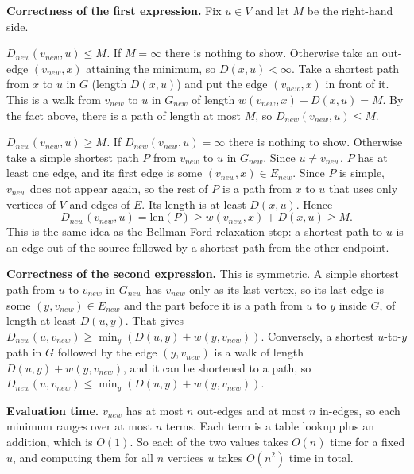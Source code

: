 \documentclass[11pt,addpoints,answers]{exam}
\begin{document}
\begin{questions}
\begin{parts}
\begin{solution}
      \textbf{Correctness of the first expression.}
      Fix $u \in V$ and let $M$ be the right-hand side.

      \emph{$D_{new}(v_{new},u) \le M$.}
      If $M = \infty$ there is nothing to show.
      Otherwise take an out-edge $(v_{new},x)$ attaining the minimum, so $D(x,u) < \infty$.
      Take a shortest path from $x$ to $u$ in $G$ (length $D(x,u)$) and put the edge $(v_{new},x)$ in front of it.
      This is a walk from $v_{new}$ to $u$ in $G_{new}$ of length $w(v_{new},x) + D(x,u) = M$.
      By the fact above, there is a path of length at most $M$, so $D_{new}(v_{new},u) \le M$.

      \emph{$D_{new}(v_{new},u) \ge M$.}
      If $D_{new}(v_{new},u) = \infty$ there is nothing to show.
      Otherwise take a simple shortest path $P$ from $v_{new}$ to $u$ in $G_{new}$.
      Since $u \ne v_{new}$, $P$ has at least one edge, and its first edge is some $(v_{new},x) \in E_{new}$.
      Since $P$ is simple, $v_{new}$ does not appear again, so the rest of $P$ is a path from $x$ to $u$ that uses only vertices of $V$ and edges of $E$.
      Its length is at least $D(x,u)$.
      Hence
      \[
        D_{new}(v_{new},u) = \text{len}(P) \ge w(v_{new},x) + D(x,u) \ge M.
      \]
      This is the same idea as the Bellman-Ford relaxation step: a shortest path to $u$ is an edge out of the source followed by a shortest path from the other endpoint.

      \textbf{Correctness of the second expression.}
      This is symmetric.
      A simple shortest path from $u$ to $v_{new}$ in $G_{new}$ has $v_{new}$ only as its last vertex, so its last edge is some $(y,v_{new}) \in E_{new}$ and the part before it is a path from $u$ to $y$ inside $G$, of length at least $D(u,y)$.
      That gives $D_{new}(u,v_{new}) \ge \min_y (D(u,y) + w(y,v_{new}))$.
      Conversely, a shortest $u$-to-$y$ path in $G$ followed by the edge $(y,v_{new})$ is a walk of length $D(u,y) + w(y,v_{new})$, and it can be shortened to a path, so $D_{new}(u,v_{new}) \le \min_y(D(u,y)+w(y,v_{new}))$.

      \textbf{Evaluation time.}
      $v_{new}$ has at most $n$ out-edges and at most $n$ in-edges, so each minimum ranges over at most $n$ terms.
      Each term is a table lookup plus an addition, which is $O(1)$.
      So each of the two values takes $O(n)$ time for a fixed $u$, and computing them for all $n$ vertices $u$ takes $O(n^2)$ time in total.
    \end{solution}


\end{parts}
\end{questions}
\end{document}
